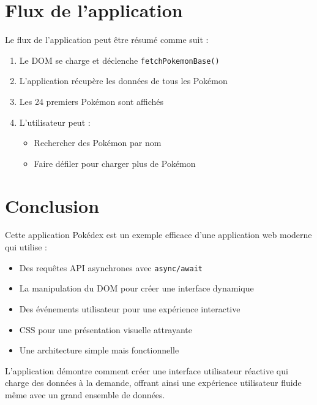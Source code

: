 \documentclass{article}
\begin{document}
\section{Flux de l'application}
Le flux de l'application peut être résumé comme suit :
\begin{enumerate}
    \item Le DOM se charge et déclenche \texttt{fetchPokemonBase()}
    \item L'application récupère les données de tous les Pokémon
    \item Les 24 premiers Pokémon sont affichés
    \item L'utilisateur peut :
    \begin{itemize}
        \item Rechercher des Pokémon par nom
        \item Faire défiler pour charger plus de Pokémon
    \end{itemize}
\end{enumerate}

\section{Conclusion}
Cette application Pokédex est un exemple efficace d'une application web moderne qui utilise :
\begin{itemize}
    \item Des requêtes API asynchrones avec \texttt{async/await}
    \item La manipulation du DOM pour créer une interface dynamique
    \item Des événements utilisateur pour une expérience interactive
    \item CSS pour une présentation visuelle attrayante
    \item Une architecture simple mais fonctionnelle
\end{itemize}

L'application démontre comment créer une interface utilisateur réactive qui charge des données à la demande, offrant ainsi une expérience utilisateur fluide même avec un grand ensemble de données.
\end{document}
